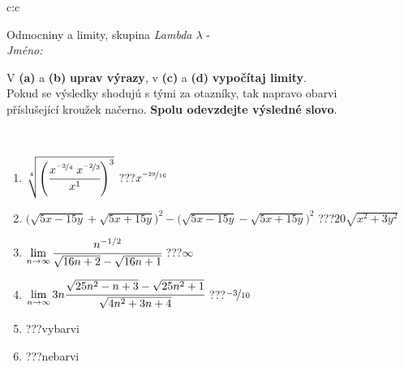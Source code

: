 \documentclass[10pt]{report}
\begin{document}
\newpage
\thispagestyle{empty}
\begin{tabular}{c:c}
\begin{minipage}[c][104.5mm][t]{0.5\linewidth}
\begin{center}
\vspace{7mm}
{\huge Odmocniny a limity, skupina \textit{Lambda $\lambda$} -}\\[5mm]
\textit{Jméno:}\phantom{xxxxxxxxxxxxxxxxxxxxxxxxxxxxxxxxxxxxxxxxxxxxxxxxxxxxxxxxxxxxxxxxx}\\[5mm]
\begin{minipage}{0.95\linewidth}
\begin{center}
V \textbf{(a)} a \textbf{(b)} \textbf{uprav výrazy}, v \textbf{(c)} a \textbf{(d)} \textbf{vypočítaj limity}.\\Pokud se výsledky shodujú s tými za otazníky, tak napravo obarvi\\příslušející kroužek načerno. \textbf{Spolu odevzdejte výsledné slovo}.
\end{center}
\end{minipage}
\\[1mm]
\begin{minipage}{0.79\linewidth}
\begin{center}
\begin{varwidth}{\linewidth}
\begin{enumerate}
\small
\item $\sqrt[4]{\left(\cfrac{x^{\nicefrac{-3}{4}}\;x^{\nicefrac{-2}{3}}}{x^{1}}\right)^{3}}$\quad \dotfill\; ???\;\dotfill \quad $x^{\nicefrac{-29}{16}}$
\item {\footnotesize{\scriptsize$\big(\sqrt{5x-15y}+\sqrt{5x+15y}\big)^2-\big(\sqrt{5x-15y}-\sqrt{5x+15y}\big)^2$}\quad \dotfill\; ???\;\dotfill \quad $20\sqrt{x^2+3y^2}$}
\item $\lim\limits_{n\to\infty}\cfrac{n^{-1/2}}{\sqrt{16n+2}-\sqrt{16n+1}}$\quad \dotfill\; ???\;\dotfill \quad $\infty$
\item $\lim\limits_{n\to\infty}3n\cfrac{\sqrt{25n^2-n+3}-\sqrt{25n^2+1}}{\sqrt{4n^2+3n+4}}$\quad \dotfill\; ???\;\dotfill \quad $\nicefrac{-3}{10}$
\item \quad \dotfill\; ???\;\dotfill \quad vybarvi
\item \quad \dotfill\; ???\;\dotfill \quad nebarvi
\end{enumerate}
\end{varwidth}
\end{center}
\end{minipage}
\begin{minipage}{0.20\linewidth}

\end{minipage}
\end{center}
\end{minipage}
\end{tabular}
\end{document}
